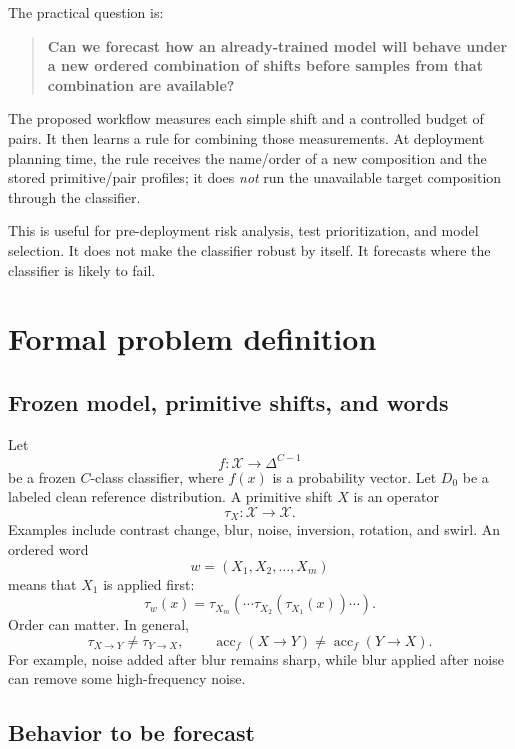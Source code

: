 \documentclass[11pt,a4paper]{article}
\newcommand{\acc}{\operatorname{acc}}
\begin{document}
The practical question is:

\begin{quote}
\textbf{Can we forecast how an already-trained model will behave under a new
ordered combination of shifts before samples from that combination are
available?}
\end{quote}

The proposed workflow measures each simple shift and a controlled budget of
pairs.  It then learns a rule for combining those measurements.  At deployment
planning time, the rule receives the name/order of a new composition and the
stored primitive/pair profiles; it does \emph{not} run the unavailable target
composition through the classifier.

This is useful for pre-deployment risk analysis, test prioritization, and model
selection.  It does not make the classifier robust by itself.  It forecasts
where the classifier is likely to fail.

\section{Formal problem definition}

\subsection{Frozen model, primitive shifts, and words}

Let
\[
f:\mathcal{X}\rightarrow\Delta^{C-1}
\]
be a frozen $C$-class classifier, where $f(x)$ is a probability vector.  Let
$D_0$ be a labeled clean reference distribution.  A primitive shift $X$ is an
operator
\[
\tau_X:\mathcal{X}\rightarrow\mathcal{X}.
\]
Examples include contrast change, blur, noise, inversion, rotation, and swirl.
An ordered word
\[
w=(X_1,X_2,\ldots,X_m)
\]
means that $X_1$ is applied first:
\[
\tau_w(x)=\tau_{X_m}\!\left(\cdots
\tau_{X_2}(\tau_{X_1}(x))\cdots\right).
\]
Order can matter.  In general,
\[
\tau_{X\to Y}\neq\tau_{Y\to X},
\qquad
\acc_f(X\to Y)\neq\acc_f(Y\to X).
\]
For example, noise added after blur remains sharp, while blur applied after
noise can remove some high-frequency noise.

\subsection{Behavior to be forecast}
\end{document}
